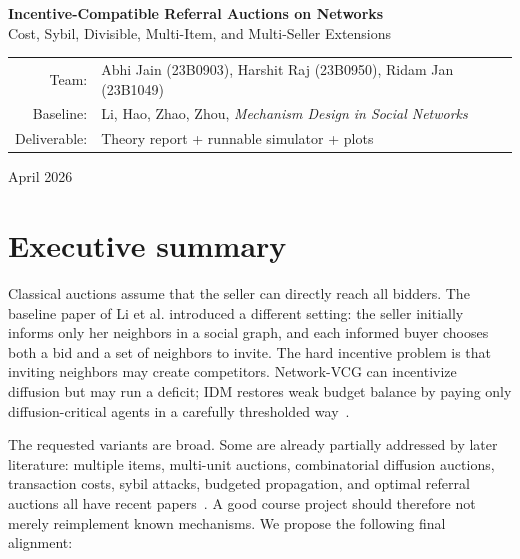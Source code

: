 \documentclass[11pt]{article}
\begin{document}
\begin{titlepage}
    \centering
    \vspace*{1.0cm}
    {\Huge\bfseries Incentive-Compatible Referral Auctions on Networks\\[0.25cm]}
    {\Large Cost, Sybil, Divisible, Multi-Item, and Multi-Seller Extensions\\[0.8cm]}
    \begin{tabular}{rl}
    Team: & Abhi Jain (23B0903), Harshit Raj (23B0950), Ridam Jan (23B1049)\\
    Baseline: & Li, Hao, Zhao, Zhou, \emph{Mechanism Design in Social Networks}\\
    Deliverable: & Theory report + runnable simulator + plots\\
    \end{tabular}
    \vfill
    \vfill
    {\large April 2026}
\end{titlepage}

\tableofcontents
\newpage

\section{Executive summary}

Classical auctions assume that the seller can directly reach all bidders.  The baseline paper of Li et al. introduced a different setting: the seller initially informs only her neighbors in a social graph, and each informed buyer chooses both a bid and a set of neighbors to invite.  The hard incentive problem is that inviting neighbors may create competitors.  Network-VCG can incentivize diffusion but may run a deficit; IDM restores weak budget balance by paying only diffusion-critical agents in a carefully thresholded way~\cite{li2017mdsn,li2022diffusion}.

The requested variants are broad.  Some are already partially addressed by later literature: multiple items, multi-unit auctions, combinatorial diffusion auctions, transaction costs, sybil attacks, budgeted propagation, and optimal referral auctions all have recent papers~\cite{zhao2018multi,fang2023multiunit,li2024transaction,chen2023sybil,zheng2024budget,bhattacharyya2024optimal,fang2024meta,li2024combinatorial}.  A good course project should therefore not merely reimplement known mechanisms.  We propose the following final alignment:
\end{document}
